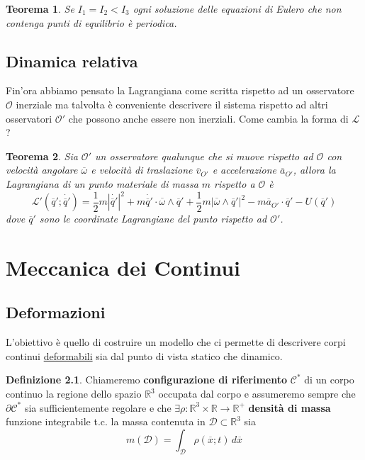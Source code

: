 \documentclass{book}
\theoremstyle{plain}
\newtheorem{teo}{Teorema}[chapter]
\theoremstyle{plain}
\theoremstyle{plain}
\theoremstyle{plain}
\theoremstyle{plain}
\theoremstyle{definition}
\newtheorem{defi}{Definizione}[chapter]
\theoremstyle{remark}
\theoremstyle{definition}
\begin{document}
\begin{teo}
    Se $I_1=I_2<I_3$ ogni soluzione delle equazioni di Eulero che non contenga punti di equilibrio è periodica.
\end{teo}

\section{Dinamica relativa}

Fin'ora abbiamo pensato la Lagrangiana come scritta rispetto ad un osservatore $\mathcal{O}$ inerziale ma talvolta è conveniente descrivere il sistema rispetto ad altri osservatori $\mathcal{O}'$ che possono anche essere non inerziali. Come cambia la forma di $\mathcal{L}$?

\begin{teo}
    Sia $\mathcal{O}'$ un osservatore qualunque che si muove rispetto ad $\mathcal{O}$ con velocità angolare $\overline{\omega}$ e velocità di traslazione $\overline{v}_{O'}$ e accelerazione $\overline{a}_{O'}$, allora la Lagrangiana di un punto materiale di massa $m$ rispetto a $\mathcal{O}$ è
    \begin{displaymath}
    \boxed{
        \mathcal{L}'(\overline{q}';\dot{\overline{q}'})=\frac{1}{2}m|\dot{\overline{q}'}|^2 + m\dot{\overline{q}'}\cdot\overline{\omega}\wedge\overline{q}' + \frac{1}{2}m|\overline{\omega}\wedge\overline{q}'|^2 -m\overline{a}_{O'}\cdot\overline{q}'-U(\overline{q}')
        }
    \end{displaymath}
    dove $\overline{q}'$ sono le coordinate Lagrangiane del punto rispetto ad $\mathcal{O'}$.
\end{teo}

\chapter{Meccanica dei Continui}

\section{Deformazioni}

L'obiettivo è quello di costruire un modello che ci permette di descrivere corpi continui \underline{deformabili} sia dal punto di vista statico che dinamico.

\begin{defi}
    Chiameremo \textbf{configurazione di riferimento} $\mathcal{C}^*$ di un corpo continuo la regione dello spazio $\mathbb{R}^3$ occupata dal corpo e assumeremo sempre che $\partial \mathcal{C}^*$ sia sufficientemente regolare e che $\exists\rho: \mathbb{R}^3\times\mathbb{R}\to\mathbb{R}^+$ \textbf{densità di massa} funzione integrabile t.c. la massa contenuta in $\mathcal{D}\subset\mathbb{R}^3$ sia
    \begin{displaymath}
        m(\mathcal{D})=\int_{\mathcal{D}}\rho(\overline{x};t)\,d\overline{x}
    \end{displaymath}
\end{defi}
\end{document}
